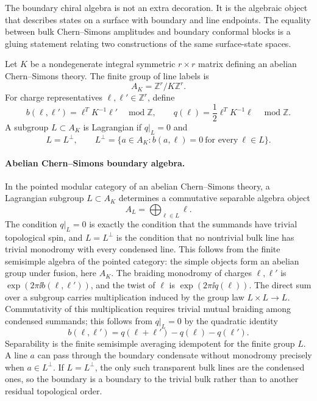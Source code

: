 The boundary chiral algebra is not an extra decoration.  It is the algebraic
object that describes states on a surface with boundary and line endpoints.
The equality between bulk Chern--Simons amplitudes and boundary conformal
blocks is a gluing statement relating two constructions of the same
surface-state spaces.

\begin{definition}
\label{def:abelian-cs-lagrangian-subgroup}
Let \(K\) be a nondegenerate integral symmetric \(r\times r\) matrix defining
an abelian Chern--Simons theory.  The finite group of line labels is
\[
  A_K=\mathbb Z^r/K\mathbb Z^r .
\]
For charge representatives \(\ell,\ell'\in\mathbb Z^r\), define
\[
  b(\ell,\ell')=\ell^T K^{-1}\ell'\quad\operatorname{mod}\mathbb Z,
  \qquad
  q(\ell)=\frac12\ell^T K^{-1}\ell\quad\operatorname{mod}\mathbb Z .
\]
A subgroup \(L\subset A_K\) is Lagrangian if \(q|_L=0\) and
\[
  L=L^\perp,
  \qquad
  L^\perp=\{a\in A_K: b(a,\ell)=0\ \text{for every}\ \ell\in L\}.
\]
\end{definition}

\paragraph{Abelian Chern--Simons boundary algebra.}
In the pointed modular category of an abelian Chern--Simons theory, a
Lagrangian subgroup \(L\subset A_K\) determines a commutative separable
algebra object
\[
  A_L=\bigoplus_{\ell\in L}\ell .
\]
The condition \(q|_L=0\) is exactly the condition that the summands have
trivial topological spin, and \(L=L^\perp\) is the condition that no nontrivial
bulk line has trivial monodromy with every condensed line.  This follows from
the finite semisimple algebra of the pointed category: the simple objects form
an abelian group under
fusion, here \(A_K\).  The braiding monodromy of charges \(\ell,\ell'\) is
\(\exp(2\pi\ii b(\ell,\ell'))\), and the twist of \(\ell\) is
\(\exp(2\pi\ii q(\ell))\).  The direct sum over a subgroup carries
multiplication induced by the group law \(L\times L\to L\).  Commutativity of
this multiplication requires trivial mutual braiding among condensed
summands; this follows from \(q|_L=0\) by the quadratic identity
\[
  b(\ell,\ell')=q(\ell+\ell')-q(\ell)-q(\ell') .
\]
Separability is the finite semisimple averaging idempotent for the finite
group \(L\).  A line \(a\) can pass through the boundary condensate without
monodromy precisely when \(a\in L^\perp\).  If \(L=L^\perp\), the only such
transparent bulk lines are the condensed ones, so the boundary is a boundary
to the trivial bulk rather than to another residual topological order.

